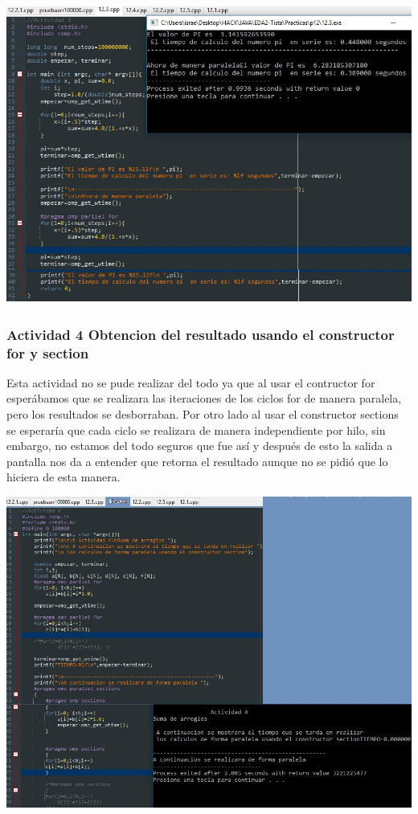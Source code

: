 \documentclass[12pt,letterpaper]{article}
\begin{document}
\includegraphics[scale=.8]{16.jpg}

\subsubsection*{Actividad 4 Obtencion del resultado usando el constructor for y  section}
Esta actividad no se pude realizar del todo ya que al usar el contructor for esperábamos que se realizara las iteraciones de los ciclos for de manera paralela, pero los resultados se desborraban. Por otro lado al usar el constructor sections se esperaría que cada ciclo se realizara de manera independiente por hilo, sin embargo, no estamos del todo seguros que fue así y después de esto la salida a pantalla nos da a entender que retorna el resultado aunque no se pidió que lo hiciera de esta manera.

\includegraphics[scale=.8]{17.jpg}
\end{document}
